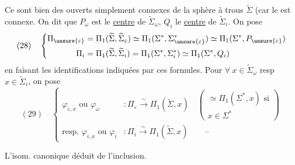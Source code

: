 Ce sont bien des ouverts  simplement connexes de la sphère à trous $\widetilde\Sigma$ (car le   est connexe. On dit que $P_\omega$ est le \uline{centre} de $\widetilde\Sigma_\omega$, $Q_i$ le \uline{centre} de $\widetilde\Sigma_i$.
On pose
\[
(28)\quad\left\{\begin{aligned}
\Pi_{\unsure{\varepsilon}}&=\Pi_1(\widetilde\Sigma,\widetilde\Sigma_\varepsilon)\simeq\Pi_1(\Sigma^*,\Sigma_{\unsure{\varepsilon}}^*)\simeq\Pi_1(\Sigma^*,P_{\unsure{\varepsilon}})\\
\Pi_i&=\Pi_1(\widetilde\Sigma,\widetilde\Sigma_i)=\Pi_1(\Sigma^*,\Sigma_i^*)\simeq\Pi_1(\Sigma^*,Q_i)
\end{aligned}\right.
\]
en faisant les identifications indiquées par ces formules.  Pour $\forall\ x\in\widetilde\Sigma_\omega$ resp $x\in\widetilde\Sigma_i$, on pose
\[
(29)\quad\left\{\begin{aligned}
\varphi_{\varepsilon,x}\text{ ou }\varphi_\omega&:\Pi_\varepsilon\xrightarrow{\sim}\Pi_1(\widetilde\Sigma,x)\quad\left(\begin{gathered}\simeq\Pi_1(\Sigma^*,x)\text{ si}\\x\in\Sigma^*\end{gathered}\right)\\
\text{resp. }\varphi_{i,x}\text{ ou }\varphi_i&:\Pi_i\xrightarrow{\sim}\Pi_1(\widetilde\Sigma,x)\qquad\text{--}
\end{aligned}\right.
\]

L'isom. canonique déduit de l'inclusion.

